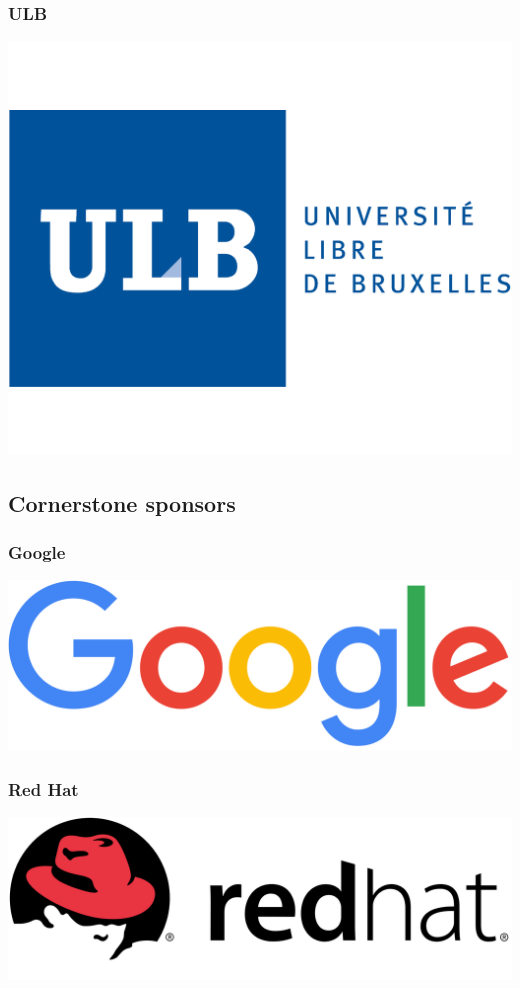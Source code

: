 \documentclass[aspectratio=169]{beamer}
\begin{document}
\begin{frame}
	\frametitle{ULB}
		\includegraphics[scale=1.5]{images/logo_ulb.png}
\end{frame}


\subsection{Cornerstone sponsors}


\begin{frame}
	\frametitle{Google}
	\vfill
		\includegraphics[scale=0.25]{images/google.png}
	\vfill
\end{frame}

\begin{frame}
	\frametitle{Red Hat}
	\vfill
		\includegraphics[scale=0.25]{images/red_hat.png}
	\vfill
\end{frame}
\end{document}
